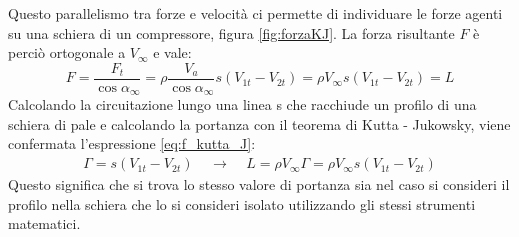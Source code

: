 Questo parallelismo tra forze e velocità ci permette di individuare le forze agenti su una schiera di un compressore, figura \ref{fig:forzaKJ}. La forza risultante $F$ è perciò ortogonale a $V_\infty$ e vale:
\begin{equation}\label{eq:f_kutta_J}
F=\frac{F_t}{\cos \alpha_{\infty}}=\rho \frac{V_a}{\cos \alpha_{\infty}}s(V_{1t}-V_{2t})=\rho V_\infty s (V_{1t}-V_{2t})=L
\end{equation}
Calcolando la circuitazione lungo una linea s che racchiude un profilo di una schiera di pale e calcolando la portanza con il teorema di Kutta - Jukowsky, viene confermata l'espressione \ref{eq:f_kutta_J}:
\begin{align*}
\Gamma=s(V_{1t}-V_{2t}) \;\;\;\; \rightarrow \;\;\;\; L=\rho V_\infty \Gamma=\rho V_\infty s (V_{1t}-V_{2t})
\end{align*}
Questo significa che si trova lo stesso valore di portanza sia nel caso si consideri il profilo nella schiera che lo si consideri isolato utilizzando gli stessi strumenti matematici.

